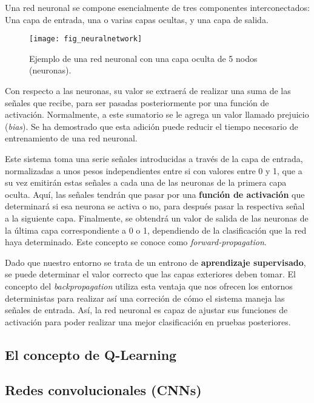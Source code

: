 \documentclass[11pt,spanish,listoffigures,listoftables]{tfgetsinf}
\begin{document}
Una red neuronal se compone esencialmente de tres componentes interconectados: Una capa de entrada, una o varias capas ocultas, y una capa de salida.

\begin{figure}[h]
	\centering
	\texttt{[image: fig\_neuralnetwork]}
	\caption{Ejemplo de una red neuronal con una capa oculta de 5 nodos (neuronas).}
	
\end{figure}

Con respecto a las neuronas, su valor se extraerá de realizar una suma de las señales que recibe, para ser pasadas posteriormente por una función de activación. Normalmente, a este sumatorio se le agrega un valor llamado prejuicio (\textit{bias}). Se ha demostrado que esta adición puede reducir el tiempo necesario de entrenamiento de una red neuronal.

Este sistema toma una serie señales introducidas a través de la capa de entrada, normalizadas a unos pesos independientes entre si con valores entre 0 y 1, que a su vez emitirán estas señales a cada una de las neuronas de la primera capa oculta. Aquí, las señales tendrán que pasar por una \textbf{función de activación} que determinará si esa neurona se activa o no, para después pasar la respectiva señal a la siguiente capa. Finalmente, se obtendrá un valor de salida de las neuronas de la última capa correspondiente a 0 o 1, dependiendo de la clasificación que la red haya determinado. Este concepto se conoce como \textit{forward-propagation}.

Dado que nuestro entorno se trata de un entrono de \textbf{aprendizaje supervisado}, se puede determinar el valor correcto que las capas exteriores deben tomar. El concepto del \textit{backpropagation} utiliza esta ventaja que nos ofrecen los entornos deterministas para realizar así una correción de cómo el sistema maneja las señales de entrada. Así, la red neuronal es capaz de ajustar sus funciones de activación para poder realizar una mejor clasificación en pruebas posteriores.

\subsection{El concepto de Q-Learning}



\subsection{Redes convolucionales (CNNs)}
\end{document}
